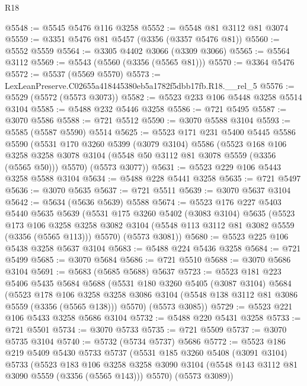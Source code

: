 \begin{lexlean}{R18}
\begin{coremodule}
@5548 := @5545 @5476 @116 @3258
@5552 := @5548 @81 @3112 @81 @3074
@5559 := @3351 @5476 @81 @5457 (@3356 (@3357 @5476 @81))
@5560 := @5552 @5559
@5564 := @3305 @4402 @3066 (@3309 @3066)
@5565 := @5564 @3112
@5569 := @5543 (@5560 (@3356 (@5565 @81)))
@5570 := @3364 @5476
@5572 := @5537 (@5569 @5570)
@5573 := LexLeanPreserve.C02655a418445380eb5a1782f5dbb17fb.R18.__rel_5
@5576 := @5529 (@5572 (@5573 @3073))
@5582 := @5523 @233 @106 @5448 @3258 @5514 @3104
@5585 := @5488 @232 @5446 @3258
@5586 := @721 @5495
@5587 := @3070 @5586
@5588 := @721 @5512
@5590 := @3070 @5588 @3104
@5593 := @5585 (@5587 @5590) @5514
@5625 := @5523
    @171
    @231
    @5400
    @5445
    @5586
    @5590
    (@5531
      @170
      @3260
      @5399
      (@3079 @3104)
      @5586
      (@5523
        @168
        @106
        @3258
        @3258
        @3078
        @3104
        (@5548 @50 @3112 @81 @3078 @5559 (@3356 (@5565 @50)))
        @5570)
      (@5573 @3077))
@5631 := @5523 @229 @106 @5443 @3258 @5588 @3104
@5634 := @5488 @228 @5441 @3258
@5635 := @721 @5497
@5636 := @3070 @5635
@5637 := @721 @5511
@5639 := @3070 @5637 @3104
@5642 := @5634 (@5636 @5639) @5588
@5674 := @5523
    @176
    @227
    @5403
    @5440
    @5635
    @5639
    (@5531
      @175
      @3260
      @5402
      (@3083 @3104)
      @5635
      (@5523
        @173
        @106
        @3258
        @3258
        @3082
        @3104
        (@5548 @113 @3112 @81 @3082 @5559 (@3356 (@5565 @113)))
        @5570)
      (@5573 @3081))
@5680 := @5523 @225 @106 @5438 @3258 @5637 @3104
@5683 := @5488 @224 @5436 @3258
@5684 := @721 @5499
@5685 := @3070 @5684
@5686 := @721 @5510
@5688 := @3070 @5686 @3104
@5691 := @5683 (@5685 @5688) @5637
@5723 := @5523
    @181
    @223
    @5406
    @5435
    @5684
    @5688
    (@5531
      @180
      @3260
      @5405
      (@3087 @3104)
      @5684
      (@5523
        @178
        @106
        @3258
        @3258
        @3086
        @3104
        (@5548 @138 @3112 @81 @3086 @5559 (@3356 (@5565 @138)))
        @5570)
      (@5573 @3085))
@5729 := @5523 @221 @106 @5433 @3258 @5686 @3104
@5732 := @5488 @220 @5431 @3258
@5733 := @721 @5501
@5734 := @3070 @5733
@5735 := @721 @5509
@5737 := @3070 @5735 @3104
@5740 := @5732 (@5734 @5737) @5686
@5772 := @5523
    @186
    @219
    @5409
    @5430
    @5733
    @5737
    (@5531
      @185
      @3260
      @5408
      (@3091 @3104)
      @5733
      (@5523
        @183
        @106
        @3258
        @3258
        @3090
        @3104
        (@5548 @143 @3112 @81 @3090 @5559 (@3356 (@5565 @143)))
        @5570)
      (@5573 @3089))

\end{coremodule}
\end{lexlean}
